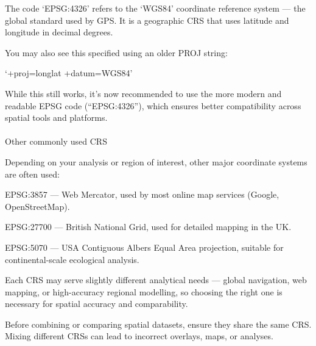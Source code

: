 \documentclass[
]{book}
\makeatletter
\let\oldparagraph\paragraph
\renewcommand{\paragraph}{
    \@ifstar
      \xxxParagraphStar
      \xxxParagraphNoStar
  }
\newcommand{\xxxParagraphStar}[1]{\oldparagraph*{#1}\mbox{}}
\newcommand{\xxxParagraphNoStar}[1]{\oldparagraph{#1}\mbox{}}
\makeatother
\begin{document}
\begin{tcolorbox}[enhanced jigsaw, left=2mm, bottomtitle=1mm, colframe=quarto-callout-note-color-frame, title=\textcolor{quarto-callout-note-color}{\faInfo}\hspace{0.5em}{What is EPSG:4326?}, breakable, coltitle=black, leftrule=.75mm, bottomrule=.15mm, arc=.35mm, toprule=.15mm, colback=white, toptitle=1mm, rightrule=.15mm, titlerule=0mm, opacityback=0, colbacktitle=quarto-callout-note-color!10!white, opacitybacktitle=0.6]

The code `EPSG:4326' refers to the `WGS84' coordinate reference system
--- the global standard used by GPS. It is a geographic CRS that uses
latitude and longitude in decimal degrees.

You may also see this specified using an older PROJ string:

`+proj=longlat +datum=WGS84'

While this still works, it's now recommended to use the more modern and
readable EPSG code (``EPSG:4326''), which ensures better compatibility
across spatial tools and platforms.

\paragraph{Other commonly used CRS}\label{other-commonly-used-crs}

Depending on your analysis or region of interest, other major coordinate
systems are often used:

EPSG:3857 --- Web Mercator, used by most online map services (Google,
OpenStreetMap).

EPSG:27700 --- British National Grid, used for detailed mapping in the
UK.

EPSG:5070 --- USA Contiguous Albers Equal Area projection, suitable for
continental-scale ecological analysis.

Each CRS may serve slightly different analytical needs --- global
navigation, web mapping, or high-accuracy regional modelling, so
choosing the right one is necessary for spatial accuracy and
comparability.

\end{tcolorbox}

\begin{tcolorbox}[enhanced jigsaw, left=2mm, bottomtitle=1mm, colframe=quarto-callout-tip-color-frame, title=\textcolor{quarto-callout-tip-color}{\faLightbulb}\hspace{0.5em}{Tip: Always check CRS compatibility}, breakable, coltitle=black, leftrule=.75mm, bottomrule=.15mm, arc=.35mm, toprule=.15mm, colback=white, toptitle=1mm, rightrule=.15mm, titlerule=0mm, opacityback=0, colbacktitle=quarto-callout-tip-color!10!white, opacitybacktitle=0.6]

Before combining or comparing spatial datasets, ensure they share the
same CRS. Mixing different CRSs can lead to incorrect overlays, maps, or
analyses.

\end{tcolorbox}
\end{document}
